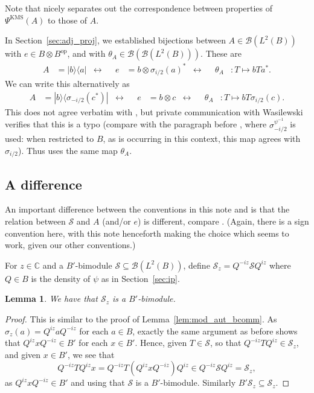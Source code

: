 \documentclass[a4paper,11pt]{article}
\theoremstyle{plain}
\newtheorem{lemma}[proposition]{Lemma}
\theoremstyle{remark}
\newcommand{\mc}[1]{\mathcal{#1}}
\newcommand{\op}{{\operatorname{op}}}
\newcommand{\KMS}{\textrm{KMS}}
\begin{document}
Note that \cite[Proposition~3.7]{Wasilewski_Quantum_Cayley} nicely separates out the correspondence between properties of $\Psi^{\KMS}(A)$ to those of $A$.

In Section~\ref{sec:adj_proj}, we established bijections between $A\in\mc B(L^2(B))$ with $e\in B\otimes B^\op$, and with $\theta_A \in \mc B(\mc B(L^2(B)))$.  These are
\begin{align*}
A &= |b\rangle \langle a| 
&\leftrightarrow&&
e &= b \otimes \sigma_{i/2}(a)^*
&\leftrightarrow&&
\theta_A &\colon T \mapsto bTa^*.
\end{align*}
We can write this alternatively as
\begin{align}  \label{eq:correspondence}
A &= |b\rangle \langle \sigma_{-i/2}(c^*) | 
&\leftrightarrow&&
e &= b \otimes c
&\leftrightarrow&&
\theta_A &\colon T \mapsto bT \sigma_{i/2}(c).
\end{align}
This does not agree verbatim with \cite[Proposition~3.14]{Wasilewski_Quantum_Cayley}, but private communication with Wasilewski verifies that this is a typo (compare with the paragraph before \cite[Proposition~3.14]{Wasilewski_Quantum_Cayley}, where $\sigma_{-i/2}^{\psi^{-1}}$ is used: when restricted to $B$, as is occurring in this context, this map agrees with $\sigma_{i/2}$).  Thus \cite[Proposition~3.14]{Wasilewski_Quantum_Cayley} uses the same map $\theta_A$.


\subsection{A difference}\label{sec:diff}

An important difference between the conventions in this note and \cite{Wasilewski_Quantum_Cayley} is that the relation between $\mc S$ and $A$ (and/or $e$) is different, compare \cite[Theorem~3.15]{Wasilewski_Quantum_Cayley}.  (Again, there is a sign convention here, with this note henceforth making the choice which seems to work, given our other conventions.)

For $z\in\mathbb C$ and a $B'$-bimodule $\mc S\subseteq\mc B(L^2(B))$, define $\mc S_z = Q^{-iz} \mc S Q^{iz}$ where $Q\in B$ is the density of $\psi$ as in Section~\ref{sec:ip}.

\begin{lemma}
We have that $\mc S_z$ is a $B'$-bimodule.
\end{lemma}
\begin{proof}
This is similar to the proof of Lemma~\ref{lem:mod_aut_bcomm}.  As $\sigma_z(a) = Q^{iz} a Q^{-iz}$ for each $a\in B$, exactly the same argument as before shows that $Q^{iz} x Q^{-iz} \in B'$ for each $x\in B'$.  Hence, given $T\in\mc S$, so that $Q^{-iz} T Q^{iz} \in \mc S_z$, and given $x\in B'$, we see that
\[ Q^{-iz} T Q^{iz} x = Q^{-iz} T (Q^{iz} x Q^{-iz}) Q^{iz}
\in Q^{-iz} \mc S Q^{iz} = \mc S_z, \]
as $Q^{iz} x Q^{-iz} \in B'$ and using that $\mc S$ is a $B'$-bimodule.  Similarly $B' \mc S_z \subseteq \mc S_z$.
\end{proof}
\end{document}

